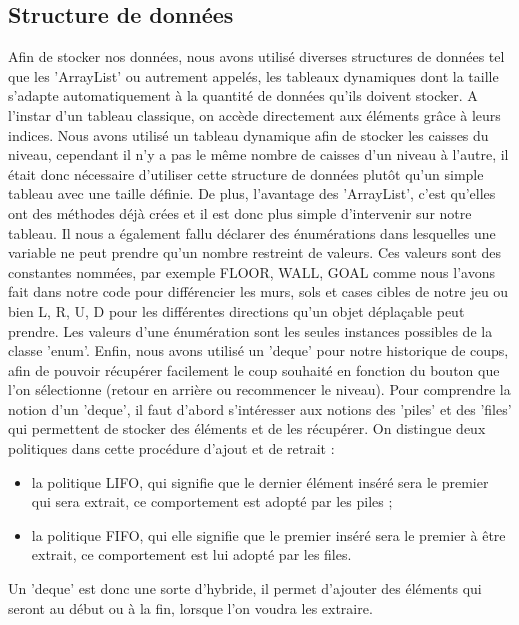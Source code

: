 \documentclass[a4paper,12pt]{article} %
\begin{document}
\newpage

\subsection{Structure de données}
Afin de stocker nos données, nous avons utilisé diverses structures de données tel que les 'ArrayList' ou autrement appelés, les tableaux dynamiques dont la taille s'adapte automatiquement à la quantité de données qu'ils doivent stocker. A l'instar d'un tableau classique, on accède directement aux éléments grâce à leurs indices. Nous avons utilisé un tableau dynamique afin de stocker les caisses du niveau, cependant il n'y a pas le même nombre de caisses d'un niveau à l'autre, il était donc nécessaire d'utiliser cette structure de données plutôt qu'un simple tableau avec une taille définie. De plus, l'avantage des 'ArrayList', c'est qu'elles ont des méthodes déjà crées et il est donc plus simple d'intervenir sur notre tableau.
Il nous a également fallu déclarer des énumérations dans lesquelles une variable ne peut prendre qu'un nombre restreint de valeurs. Ces valeurs sont des constantes nommées, par exemple FLOOR, WALL, GOAL comme nous l'avons fait dans notre code pour différencier les murs, sols et cases cibles de notre jeu ou bien L, R, U, D pour les différentes directions qu'un objet déplaçable peut prendre. Les valeurs d'une énumération sont les seules instances possibles de la classe 'enum'.
Enfin, nous avons utilisé un 'deque' pour notre historique de coups, afin de pouvoir récupérer facilement le coup souhaité en fonction du bouton que l'on sélectionne (retour en arrière ou recommencer le niveau). Pour comprendre la notion d'un 'deque', il faut d'abord s'intéresser aux notions des 'piles' et des 'files' qui permettent de stocker des éléments et de les récupérer. On distingue deux politiques dans cette procédure d'ajout et de retrait :
\begin{itemize}
\item la politique LIFO, qui signifie que le dernier élément inséré sera le premier qui sera extrait, ce comportement est adopté par les piles ;
\item la politique FIFO, qui elle signifie que le premier inséré sera le premier à être extrait, ce comportement est lui adopté par les files.
\end{itemize}
Un 'deque' est donc une sorte d'hybride, il permet d'ajouter des éléments qui seront au début ou à la fin, lorsque l'on voudra les extraire.
\end{document}
